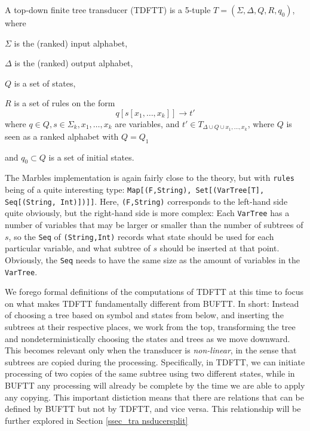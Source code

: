 A top-down finite tree transducer (TDFTT) is a 5-tuple $T = (\Sigma,
\Delta, Q, R, q_0)$, where
\begin{compactitem}
\item $\Sigma$ is the (ranked) input alphabet,
\item $\Delta$ is the (ranked) output alphabet,
\item $Q$ is a set of states,
\item $R$ is a set of rules on the form
$$q[s[x_1,\ldots,x_k]] \rightarrow t'$$ where
$q \in Q, s \in \Sigma_k, x_1,\ldots,x_k$ are variables, and
$t' \in T_{\Delta \cup Q \cup {x_1,\ldots,x_k}}$, where $Q$ is seen as a
ranked alphabet with $Q = Q_1$
\item and $q_0 \subset Q$ is a set of initial states.
\end{compactitem}

The Marbles implementation is again fairly close to the theory, but with
\texttt{rules} being of a quite interesting type: \texttt{Map[(F,String),
Set[(VarTree[T], Seq[(String, Int)])]]}. Here, \texttt{(F,String)}
corresponds to the left-hand side quite obviously, but the right-hand side
is more complex: Each \texttt{VarTree} has a number of variables that may
be larger or smaller than the number of subtrees of $s$, so the \texttt{Seq} of
\texttt{(String,Int)} records what state should be used for each particular
variable, and what subtree of $s$ should be inserted at that point.
Obviously, the \texttt{Seq} needs to have the same size as the amount of
variables in the \texttt{VarTree}.

We forego formal definitions of the computations of TDFTT at this time to
focus on what makes TDFTT fundamentally different from BUFTT. In short:
Instead of choosing a tree based on symbol and states from below, and
inserting the subtrees at their respective places, we work from the top,
transforming the tree and nondeterministically choosing the states and
trees as we move downward.  This becomes relevant only when the transducer
is \emph{non-linear}, in the sense that subtrees are copied during the
processing. Specifically, in TDFTT, we can initiate processing of two
copies of the same subtree using two different states, while in BUFTT any
processing will already be complete by the time we are able to apply any
copying. This important distiction means that there are relations that can
be defined by BUFTT but not by TDFTT, and vice versa. This relationship
will be further explored in Section \ref{ssec_tra nsducersplit}


